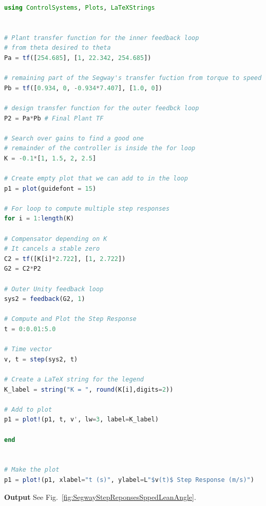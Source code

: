 \begin{lstlisting}[language=Julia,style=mystyle]
using ControlSystems, Plots, LaTeXStrings


# Plant transfer function for the inner feedback loop
# from theta desired to theta
Pa = tf([254.685], [1, 22.342, 254.685]) 

# remaining part of the Segway's transfer fuction from torque to speed
Pb = tf([0.934, 0, -0.934*7.407], [1.0, 0])

# design transfer function for the outer feedbck loop
P2 = Pa*Pb # Final Plant TF

# Search over gains to find a good one
# remainder of the controller is inside the for loop
K = -0.1*[1, 1.5, 2, 2.5] 

# Create empty plot that we can add to in the loop
p1 = plot(guidefont = 15)

# For loop to compute multiple step responses
for i = 1:length(K)

# Compensator depending on K
# It cancels a stable zero
C2 = tf([K[i]*2.722], [1, 2.722])
G2 = C2*P2

# Outer Unity feedback loop
sys2 = feedback(G2, 1)

# Compute and Plot the Step Response
t = 0:0.01:5.0

# Time vector
v, t = step(sys2, t)

# Create a LaTeX string for the legend
K_label = string("K = ", round(K[i],digits=2)) 

# Add to plot
p1 = plot!(p1, t, v', lw=3, label=K_label)

end


# Make the plot
p1 = plot!(p1, xlabel="t (s)", ylabel=L"$v(t)$ Step Response (m/s)")
\end{lstlisting}
\textbf{Output} 
See Fig.~\ref{fig:SegwayStepReponsesSppedLeanAngle}.



